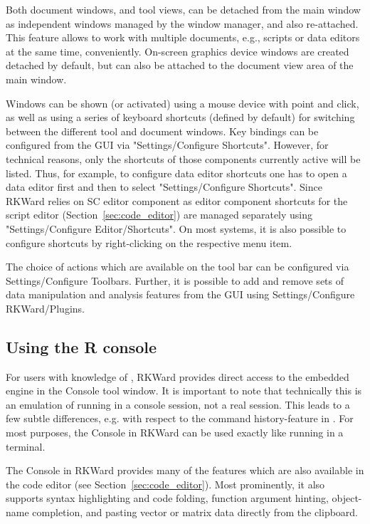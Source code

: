 Both document windows, and tool views, can be detached from the main
window as independent windows managed by the window manager, and also
re-attached. This feature allows to work with multiple documents, e.g.,
scripts or data editors at the same time, conveniently. On{}-screen
graphics device windows are created detached by default, but can also
be attached to the document view area of the main window.

Windows can be shown (or activated) using a mouse device with point and
click, as well as using a series of keyboard shortcuts (defined by
default) for switching between the different tool and document windows.
Key bindings can be configured from the GUI via "Settings/Configure
Shortcuts". However, for technical reasons, only the shortcuts of those
components currently active will be listed. Thus, for example, to
configure data editor shortcuts one has to open a data editor first and
then to select "Settings/Configure Shortcuts". Since RKWard relies on
 SC editor component as editor component
shortcuts for the script editor (Section~\ref{sec:code_editor}) are managed separately using
"Settings/Configure Editor/Shortcuts". On most systems, it is also
possible to configure shortcuts by right-clicking on the respective
menu item.

The choice of actions which are available on the tool bar can be
configured via Settings/Configure Toolbars. Further, it is possible to add and remove sets
of data manipulation and analysis features from the GUI using
Settings/Configure RKWard/Plugins.

\subsection{Using the R console}
\label{sec:using_R_console}
For users with knowledge of , RKWard provides direct access to the
embedded  engine in the
 Console tool window. It is important to note that technically this is an
emulation of  running in a console
session, not a real  session. This leads to a few subtle
differences, e.g. with respect to the command history-feature in
. For most purposes, the  Console in RKWard can be used exactly
like  running in a terminal.

The  Console in RKWard provides many of the
features which are also available in the code editor (see Section~\ref{sec:code_editor}).
Most prominently, it also supports syntax highlighting and code
folding, function argument hinting, object-name completion, and pasting
vector or matrix data directly from the clipboard.

